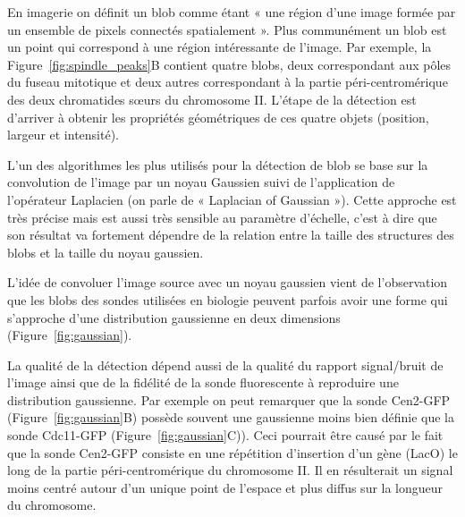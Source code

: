 \documentclass[12pt,a4paper,twoside,openright]{book}
\begin{document}
En imagerie on définit un blob comme étant « une région d'une image
formée par un ensemble de pixels connectés spatialement ». Plus
communément un blob est un point qui correspond à une région
intéressante de l'image. Par exemple, la Figure~\ref{fig:spindle_peaks}B
contient quatre blobs, deux correspondant aux pôles du fuseau mitotique
et deux autres correspondant à la partie péri-centromérique des deux
chromatides sœurs du chromosome II. L'étape de la détection est
d'arriver à obtenir les propriétés géométriques de ces quatre objets
(position, largeur et intensité).

L'un des algorithmes les plus utilisés pour la détection de blob se base
sur la convolution de l'image par un noyau Gaussien suivi de
l'application de l'opérateur Laplacien (on parle de « Laplacian of
Gaussian »). Cette approche est très précise mais est aussi très
sensible au paramètre d'échelle, c'est à dire que son résultat va
fortement dépendre de la relation entre la taille des structures des
blobs et la taille du noyau gaussien.

L'idée de convoluer l'image source avec un noyau gaussien vient de
l'observation que les blobs des sondes utilisées en biologie peuvent
parfois avoir une forme qui s'approche d'une distribution gaussienne en
deux dimensions (Figure~\ref{fig:gaussian}).

La qualité de la détection dépend aussi de la qualité du rapport
signal/bruit de l'image ainsi que de la fidélité de la sonde
fluorescente à reproduire une distribution gaussienne. Par exemple on
peut remarquer que la sonde Cen2-GFP (Figure~\ref{fig:gaussian}B)
possède souvent une gaussienne moins bien définie que la sonde Cdc11-GFP
(Figure~\ref{fig:gaussian}C)). Ceci pourrait être causé par le fait que
la sonde Cen2-GFP consiste en une répétition d'insertion d'un gène
(LacO) le long de la partie péri-centromérique du chromosome II. Il en
résulterait un signal moins centré autour d'un unique point de l'espace
et plus diffus sur la longueur du chromosome.
\end{document}
